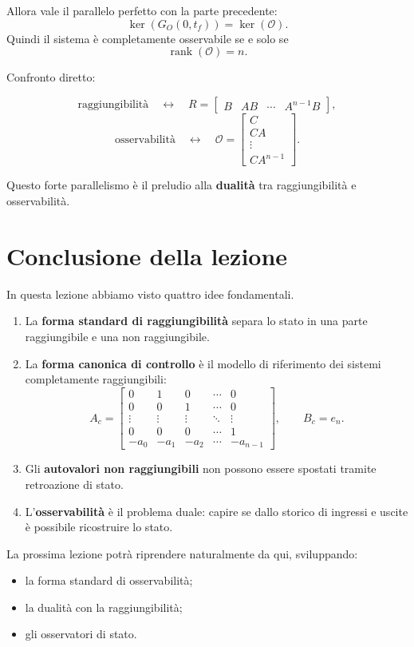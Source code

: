 Allora vale il parallelo perfetto con la parte precedente:
\[
\ker(G_O(0,t_f))=\ker(\mathcal O).
\]
Quindi il sistema è completamente osservabile se e solo se
\[
\operatorname{rank}(\mathcal O)=n.
\]

\bigskip

Confronto diretto:

\[
\text{raggiungibilità}
\quad\longleftrightarrow\quad
R=\begin{bmatrix}B & AB & \cdots & A^{n-1}B\end{bmatrix},
\]
\[
\text{osservabilità}
\quad\longleftrightarrow\quad
\mathcal O=
\begin{bmatrix}
C\\CA\\ \vdots\\ CA^{n-1}
\end{bmatrix}.
\]

Questo forte parallelismo è il preludio alla \textbf{dualità} tra raggiungibilità e osservabilità.

\section{Conclusione della lezione}

In questa lezione abbiamo visto quattro idee fondamentali.

\begin{enumerate}
    \item La \textbf{forma standard di raggiungibilità} separa lo stato in una parte raggiungibile e una non raggiungibile.

    \item La \textbf{forma canonica di controllo} è il modello di riferimento dei sistemi completamente raggiungibili:
    \[
    A_c=
    \begin{bmatrix}
    0 & 1 & 0 & \cdots & 0\\
    0 & 0 & 1 & \cdots & 0\\
    \vdots & \vdots & \vdots & \ddots & \vdots\\
    0 & 0 & 0 & \cdots & 1\\
    -a_0 & -a_1 & -a_2 & \cdots & -a_{n-1}
    \end{bmatrix},
    \qquad
    B_c=e_n.
    \]

    \item Gli \textbf{autovalori non raggiungibili} non possono essere spostati tramite retroazione di stato.

    \item L’\textbf{osservabilità} è il problema duale: capire se dallo storico di ingressi e uscite è possibile ricostruire lo stato.
\end{enumerate}

\bigskip

La prossima lezione potrà riprendere naturalmente da qui, sviluppando:
\begin{itemize}
    \item la forma standard di osservabilità;
    \item la dualità con la raggiungibilità;
    \item gli osservatori di stato.
\end{itemize}